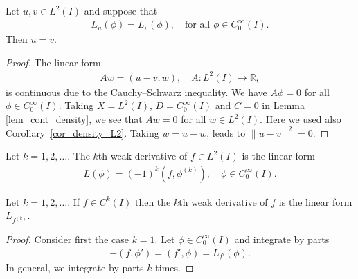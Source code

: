 \documentclass[12pt,oneside,final]{amsart}
\def\R{\mathbb R}
\begin{document}
\begin{lemma}
Let $u, v \in L^2(I)$ and suppose that 
    \begin{align*}
L_u(\phi) = L_v(\phi), \quad \text{for all $\phi \in C_0^\infty(I)$}.
    \end{align*}
Then $u = v$.
\end{lemma}
\begin{proof}
The linear form 
    \begin{align*}
A w = (u - v, w), \quad A : L^2(I) \to \R,
    \end{align*}
is continuous due to the Cauchy--Schwarz inequality.
We have $A \phi = 0$ for all $\phi \in C_0^\infty(I)$.
Taking $X=L^2(I)$, $D=C_0^\infty(I)$ and $C=0$ in Lemma \ref{lem_cont_density}, we see that $Aw = 0$ for all $w \in L^2(I)$.
Here we used also Corollary~\ref{cor_density_L2}.
Taking $w = u-w$, leads to $\|u-v\|^2 = 0$.
\end{proof}

\begin{definition}
Let $k=1,2,\dots$.
The $k$th weak derivative of $f \in L^2(I)$ is the linear form
    \begin{align*}
L(\phi) = (-1)^k (f, \phi^{(k)}), \quad \phi \in C_0^\infty(I).
    \end{align*}
\end{definition}

\begin{lemma}\label{lem_weak_classic}
Let $k=1,2,\dots$.
If $f \in C^k(I)$ then the $k$th weak derivative of $f$ is the linear form $L_{f^{(k)}}$.
\end{lemma}
\begin{proof}
Consider first the case $k=1$.
Let $\phi \in C_0^\infty(I)$ and integrate by parts
    \begin{align*}
-(f, \phi') = (f', \phi) = L_{f'}(\phi).
    \end{align*}
In general, we integrate by parts $k$ times. 
\end{proof}
\end{document}
